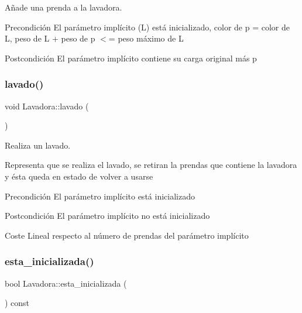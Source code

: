 Añade una prenda a la lavadora. 

\begin{DoxyPrecond}{Precondición}
El parámetro implícito (L) está inicializado, color de p = color de L, peso de L + peso de p $<$= peso máximo de L 
\end{DoxyPrecond}
\begin{DoxyPostcond}{Postcondición}
El parámetro implícito contiene su carga original más p 
\end{DoxyPostcond}
\mbox{\label{class_lavadora_a82bd403e688482030fcb95f0c3fd62d1}} 
\subsubsection{\texorpdfstring{lavado()}{lavado()}}
{\footnotesize\ttfamily void Lavadora\+::lavado (\begin{DoxyParamCaption}{ }\end{DoxyParamCaption})}



Realiza un lavado. 

Representa que se realiza el lavado, se retiran la prendas que contiene la lavadora y ésta queda en estado de volver a usarse \begin{DoxyPrecond}{Precondición}
El parámetro implícito está inicializado 
\end{DoxyPrecond}
\begin{DoxyPostcond}{Postcondición}
El parámetro implícito no está inicializado 
\end{DoxyPostcond}
\begin{DoxyParagraph}{Coste}
Lineal respecto al número de prendas del parámetro implícito 
\end{DoxyParagraph}
\mbox{\label{class_lavadora_af081f8133ddfca2fd4f1f79575620c5a}} 
\subsubsection{\texorpdfstring{esta\+\_\+inicializada()}{esta\_inicializada()}}
{\footnotesize\ttfamily bool Lavadora\+::esta\+\_\+inicializada (\begin{DoxyParamCaption}{ }\end{DoxyParamCaption}) const}



